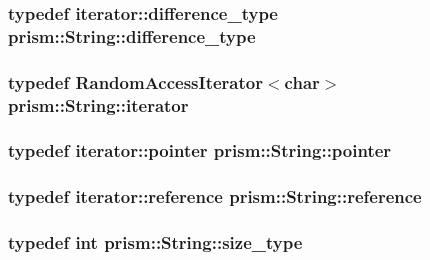 \subsubsection[{\texorpdfstring{difference\+\_\+type}{difference_type}}]{\setlength{\rightskip}{0pt plus 5cm}typedef iterator\+::difference\+\_\+type {\bf prism\+::\+String\+::difference\+\_\+type}}\hypertarget{classprism_1_1_string_a50fc3d423db1d24c511b28b24e4a7c00}{}\label{classprism_1_1_string_a50fc3d423db1d24c511b28b24e4a7c00}
\subsubsection[{\texorpdfstring{iterator}{iterator}}]{\setlength{\rightskip}{0pt plus 5cm}typedef Random\+Access\+Iterator$<$char$>$ {\bf prism\+::\+String\+::iterator}}\hypertarget{classprism_1_1_string_adacc7975837e5fff95d70690777fb330}{}\label{classprism_1_1_string_adacc7975837e5fff95d70690777fb330}
\subsubsection[{\texorpdfstring{pointer}{pointer}}]{\setlength{\rightskip}{0pt plus 5cm}typedef iterator\+::pointer {\bf prism\+::\+String\+::pointer}}\hypertarget{classprism_1_1_string_ac7944d9212ad675ba05280657ce14d12}{}\label{classprism_1_1_string_ac7944d9212ad675ba05280657ce14d12}
\subsubsection[{\texorpdfstring{reference}{reference}}]{\setlength{\rightskip}{0pt plus 5cm}typedef iterator\+::reference {\bf prism\+::\+String\+::reference}}\hypertarget{classprism_1_1_string_a0abe551090035c27a0f80ea403199727}{}\label{classprism_1_1_string_a0abe551090035c27a0f80ea403199727}
\subsubsection[{\texorpdfstring{size\+\_\+type}{size_type}}]{\setlength{\rightskip}{0pt plus 5cm}typedef int {\bf prism\+::\+String\+::size\+\_\+type}}\hypertarget{classprism_1_1_string_a33d0fff8e7a3f85f43487c6975e3e766}{}\label{classprism_1_1_string_a33d0fff8e7a3f85f43487c6975e3e766}
